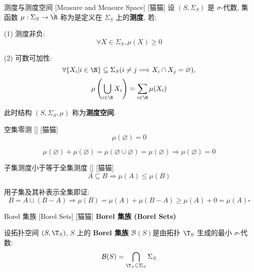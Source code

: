 \documentclass[UTF8]{ctexart}
\begin{document}
            \begin{dfn}
                {测度与测度空间}
                [Measure and Measure Space]
                [猫猫]
                设 \((S,\Sigma_S)\) 是 \(\sigma\)-代数, 集函数 \(\mu:\Sigma_S\to\bar{\R}\) 称为是定义在 \(\Sigma_S\) 上的\textbf{测度}, 若: 

                (1) 测度非负: 
                \[\forall X\in\Sigma_S, \mu(X)\geq 0\]

                (2) 可数可加性: 
                \[\forall\{X_i|i\in\N\}\subseteq\Sigma_S(i\neq j\Longrightarrow X_i\cap X_j=\varnothing), \]
                \[\mu\left(\bigcup_{i\in\N}X_i\right)=\sum_{i\in\N}\mu(X_i)\]

                此时结构 \((S,\Sigma_S,\mu)\) 称为\textbf{测度空间}. 
            \end{dfn}
            
            \begin{ppt}
                {空集零测}
                []
                [猫猫]
                \[\mu(\varnothing)=0\]
            \end{ppt}
            
            \begin{prf}
                \[\mu(\varnothing)+\mu(\varnothing)=\mu(\varnothing\cup\varnothing)=\mu(\varnothing)\Longrightarrow\mu(\varnothing)=0\]
            \end{prf}
            
            \begin{ppt}
                {子集测度小于等于全集测度}
                []
                [猫猫]
                \[A\subseteq B\Longrightarrow\mu(A)\leq\mu(B)\]
            \end{ppt}
            
            \begin{prf}
                用子集及其补表示全集即证: 
                \[B=A\cup(B-A)\Longrightarrow\mu(B)=\mu(A)+\mu(B-A)\geq\mu(A)+0=\mu(A)\square\]
            \end{prf}
            
            \begin{dfn}
                {Borel 集族}
                [Borel Sets]
                [猫猫]
                \textbf{Borel 集族 (Borel Sets)}

                设拓扑空间 \((S,\T_S)\), \(S\) 上的 \textbf{Borel 集族} \(\mathcal{B}(S)\)是由拓扑 \(\T_S\) 生成的最小 \(\sigma\)-代数: 
                \[\mathcal{B}(S)=\bigcap_{\T_S\subseteq\Sigma_S}\Sigma_S\]
            \end{dfn}
            
\end{document}
